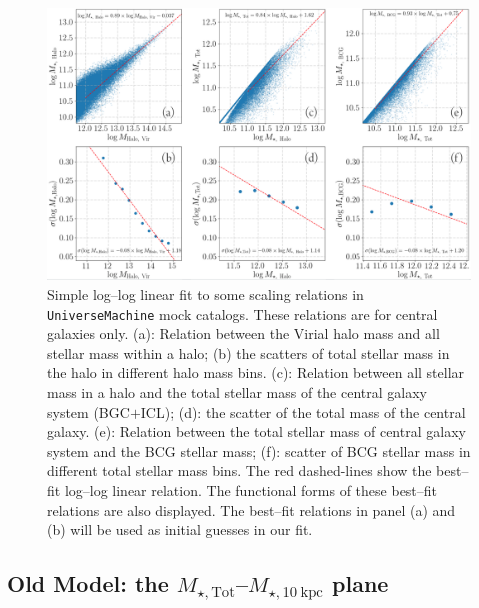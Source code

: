\documentclass[a4paper,fleqn,usenatbib]{mnras}
\def\mtot{{$M_{\star,\mathrm{Tot}}$}}
\def\minn{{$M_{\star,10\ \mathrm{kpc}}$}}
\def\um{\texttt{UniverseMachine}}
\begin{document}
    \begin{figure}
        \centering 
        \includegraphics[width=\textwidth]{fig/um2_relation_initial}
            \caption{
                Simple log--log linear fit to some scaling relations in 
                \um{} mock catalogs.  
                These relations are for central galaxies only.  
                (a): Relation between the Virial halo mass and all stellar mass within 
                a halo; 
                (b) the scatters of total stellar mass in the halo in different halo 
                mass bins.  
                (c): Relation between all stellar mass in a halo and the total stellar 
                mass of the central galaxy system (BGC$+$ICL); 
                (d): the scatter of the total mass of the central galaxy.  
                (e): Relation between the total stellar mass of central galaxy system 
                and the BCG stellar mass; 
                (f): scatter of BCG stellar mass in different total stellar mass bins.   
                The red dashed-lines show the best--fit log--log linear relation.  
                The functional forms of these best--fit relations are also displayed.  
                The best--fit relations in panel (a) and (b) will be used as initial 
                guesses in our fit.
                }
        \label{fig:um2_stellar}
    \end{figure}

\subsection{Old Model: the \mtot{}--\minn{} plane}
    \label{ssec:old_m100_m10}
    
\end{document}
